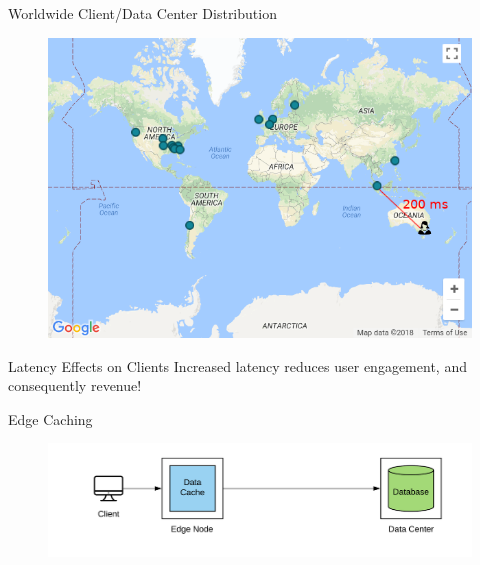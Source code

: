 \documentclass[10pt]{beamer}
\begin{document}
\begin{frame}{Worldwide Client/Data Center Distribution}
    \begin{figure}
        \center
        \includegraphics[scale=0.45]{apollo_google_oceania}
    \end{figure}
\end{frame}

\begin{frame}{Latency Effects on Clients}
    Increased latency reduces \alert{user engagement}, and consequently \alert{revenue}!~\cite{bing}
\end{frame}

\begin{frame}{Edge Caching}
    \begin{figure}
        \center
        \hspace*{-1.5cm}
        \includegraphics[scale=0.17]{apollo_edge_cache}
    \end{figure}
\end{frame}
\end{document}
